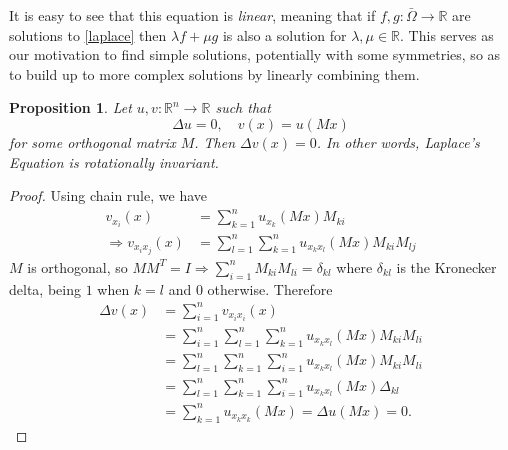 \documentclass[openany, amssymb, psamsfonts]{amsart}
\newtheorem{prop}{Proposition}[section]
\theoremstyle{definition}
\numberwithin{equation}{section}
\newcommand{\bbr}{\mathbb{R}}
\let\implies\Rightarrow
\begin{document}
It is easy to see that this equation is \textit{linear}, meaning that if $f, g: \bar{\Omega} \to \bbr$ are solutions to \eqref{laplace} then $\lambda f + \mu g$ is also a solution for $\lambda, \mu \in \bbr$. This serves as our motivation to find simple solutions, potentially with some symmetries, so as to build up to more complex solutions by linearly combining them.

\begin{prop}
    Let $u, v: \bbr^n \to \bbr$ such that \[
        \Delta u = 0, \quad v(x) = u(Mx)
    \] for some orthogonal matrix $M$. Then $\Delta v(x) = 0$. In other words, Laplace's Equation is \textit{rotationally invariant}.
\end{prop}
\begin{proof}
    Using chain rule, we have
    \begin{align*}
        v_{x_i} (x)             & = \sum_{k=1}^{n}u_{x_k}(Mx)M_{ki}                          \\
        \implies v_{x_i x_j}(x) & =  \sum_{l=1}^{n}\sum_{k=1}^{n}u_{x_k x_l}(Mx)M_{ki}M_{lj}
    \end{align*}
    $M$ is orthogonal, so $MM^T = I \implies \sum_{i=1}^{n} M_{ki} M_{li} = \delta_{kl}$ where $\delta_{kl}$ is the Kronecker delta, being $1$ when $k = l$ and $0$ otherwise. Therefore
    \begin{align*}
        \Delta v(x) & = \sum_{i=1}^{n}v_{x_i x_i}(x)                                             \\
                    & = \sum_{i=1}^{n} \sum_{l=1}^{n}\sum_{k=1}^{n}u_{x_k x_l}(Mx)M_{ki}M_{li}   \\
                    & = \sum_{l=1}^{n}\sum_{k=1}^{n}  \sum_{i=1}^{n} u_{x_k x_l}(Mx)M_{ki}M_{li} \\
                    & = \sum_{l=1}^{n}\sum_{k=1}^{n}  \sum_{i=1}^{n} u_{x_k x_l}(Mx)\Delta_{kl}  \\
                    & = \sum_{k=1}^{n}u_{x_k x_k}(Mx) = \Delta u(Mx) = 0.
    \end{align*}
\end{proof}
\end{document}
